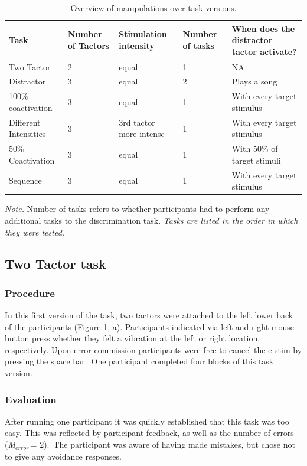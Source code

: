 \documentclass[twocolumn, serif, authordate, review]{jote-article}
\begin{document}
\begin{table}\sffamily
\begin{tabularx}{\textwidth}{@{}p{}p{}p{}p{}X}
\toprule Task & Number of Tactors & Stimulation intensity & Number of tasks & When does the distractor tactor activate?\tabularnewline \midrule 
Two Tactor & 2 & equal & 1 & NA\tabularnewline Distractor & 3 & equal & 2 & Plays a song\tabularnewline 100\% coactivation & 3 & equal & 1 & With every target stimulus\tabularnewline Different Intensities & 3 & 3rd tactor more intense & 1 & With every target stimulus\tabularnewline 50\% Coactivation & 3 & equal & 1 & With 50\% of target stimuli\tabularnewline Sequence & 3 & equal & 1 & With every target stimulus\tabularnewline \bottomrule 
\end{tabularx}
\caption{Overview of manipulations over task versions.}
\label{tab:manipulations}
\end{table}

\emph{Note.} Number of tasks refers to whether participants had to perform any additional tasks to the discrimination task. \emph{Tasks are listed in the order in which they were tested.}

{}
\subsection*{Two Tactor task}
\gotoreview
\label{sec:twotactor}
\subsubsection*{Procedure}In this first version of the task, two tactors were attached to the left lower back of the participants (Figure 1, a). Participants indicated via left and right mouse button press whether they felt a vibration at the left or right location, respectively. Upon error commission participants were free to cancel the e-stim by pressing the space bar.~One participant completed four blocks of this task version.

\subsubsection*{Evaluation} After running one participant it was quickly established that this task was too easy. This was reflected by participant feedback, as well as the number of errors (\textit{M${}_{error\ }$}= 2).~The participant was aware of having made mistakes, but chose not to give any avoidance responses.
\end{document}
